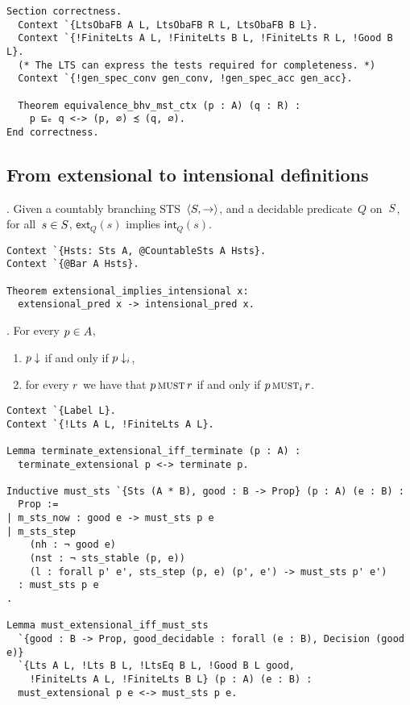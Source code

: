 \begin{mdframed}
\begin{verbatim}
Section correctness.
  Context `{LtsObaFB A L, LtsObaFB R L, LtsObaFB B L}.
  Context `{!FiniteLts A L, !FiniteLts B L, !FiniteLts R L, !Good B L}.
  (* The LTS can express the tests required for completeness. *)
  Context `{!gen_spec_conv gen_conv, !gen_spec_acc gen_acc}.

  Theorem equivalence_bhv_mst_ctx (p : A) (q : R) :
    p ⊑ₑ q <-> (p, ∅) ≾ (q, ∅).
End correctness.
\end{verbatim}
\end{mdframed}

\subsection{From extensional to intensional definitions}

.
Given a countably branching STS~$\langle S, \to \rangle$, and a decidable predicate~$Q$
on~$S$, for all~$s \in S$, $\mathsf{ext}_Q(s)$ implies
$\mathsf{int}_Q(s).$

\begin{mdframed}
\begin{verbatim}
Context `{Hsts: Sts A, @CountableSts A Hsts}.
Context `{@Bar A Hsts}.

Theorem extensional_implies_intensional x:
  extensional_pred x -> intensional_pred x.
\end{verbatim}
\end{mdframed}

.
For every $p \in A$,
\begin{enumerate}
\item $p \downarrow $ if and only if $p \downarrow_i$,
\item for every $r$ we have that $p \operatorname{\textsc{must}} r$ if
  and only if $p \operatorname{\textsc{must}}_i r$.
\end{enumerate}

\begin{mdframed}
\begin{verbatim}
Context `{Label L}.
Context `{!Lts A L, !FiniteLts A L}.

Lemma terminate_extensional_iff_terminate (p : A) :
  terminate_extensional p <-> terminate p.

Inductive must_sts `{Sts (A * B), good : B -> Prop} (p : A) (e : B) :
  Prop :=
| m_sts_now : good e -> must_sts p e
| m_sts_step
    (nh : ¬ good e)
    (nst : ¬ sts_stable (p, e))
    (l : forall p' e', sts_step (p, e) (p', e') -> must_sts p' e')
  : must_sts p e
.

Lemma must_extensional_iff_must_sts
  `{good : B -> Prop, good_decidable : forall (e : B), Decision (good e)}
  `{Lts A L, !Lts B L, !LtsEq B L, !Good B L good,
    !FiniteLts A L, !FiniteLts B L} (p : A) (e : B) :
  must_extensional p e <-> must_sts p e.
\end{verbatim}
\end{mdframed}

